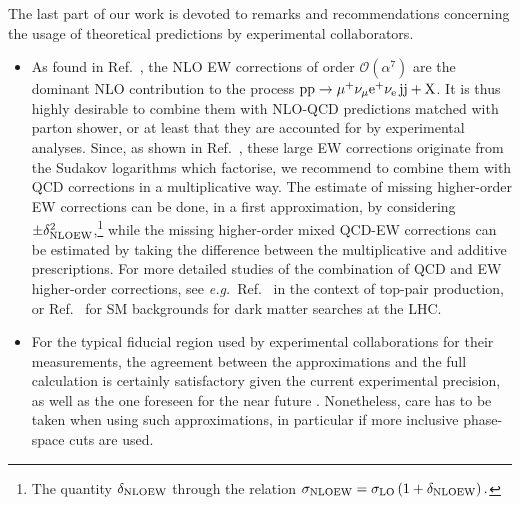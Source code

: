 The last part of our work is devoted to 
 remarks and recommendations concerning the usage of theoretical predictions by experimental collaborators.
\begin{itemize}
    \item As found in Ref.~\cite{Biedermann:2017bss}, the NLO EW corrections of order $\mathcal{O}{\left(\alpha^{7}\right)}$ are 
        the dominant NLO contribution to the process $\text{p}\text{p}\to\mu^+\nu_\mu{\rm e}^+\nu_{\rm e}\,\text{j}\text{j}+\mathrm{X}$.
        It is thus highly desirable to combine them with NLO-QCD predictions matched with parton shower, or at least that they are accounted for
        by experimental analyses. Since, as shown in Ref.~\cite{Biedermann:2016yds}, 
        these large EW corrections originate from the Sudakov logarithms which factorise, we recommend to combine them with QCD 
        corrections in a multiplicative way. The estimate of missing higher-order EW corrections can be done, 
        in a first approximation, by considering $\pm \delta^2_{\rm NLO EW}$,\footnote{The quantity $\delta_{\rm NLO EW}$ through the relation $\sigma_{\rm NLO EW} = \sigma_{\rm LO} \left(1+ \delta_{\rm NLO EW}\right).$} while the missing higher-order mixed QCD-EW corrections 
        can be estimated by taking the difference between the multiplicative and additive prescriptions.
        For more detailed studies of the combination of QCD and EW higher-order corrections, see
        \emph{e.g.}\, Ref.~\cite{Czakon:2017wor} in the context of top-pair production, or Ref.~\cite{Lindert:2017olm} for SM 
        backgrounds for dark matter searches at the LHC.
    \item For the typical fiducial region used by experimental collaborations for their measurements, 
        the agreement between the approximations and the full calculation is certainly satisfactory given 
        the current experimental precision, as well as the one foreseen for the near future \cite{CMSCollaboration:2015zni,CMS:2016rcn}.
        Nonetheless, care has to be taken when using such approximations, in particular if more inclusive phase-space cuts are used.



\end{itemize}
